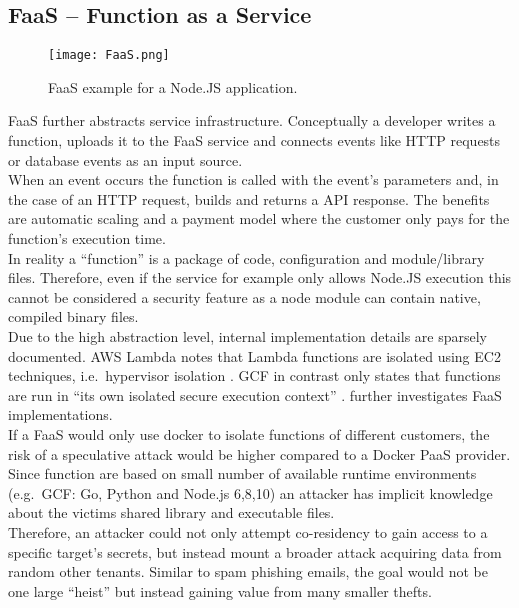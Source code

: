 \documentclass[conference,compsoc,final,a4paper]{IEEEtran}
\begin{document}
\subsection{\acs{FaaS} -- Function as a Service}
\begin{figure}[!ht]
\centering
\texttt{[image: FaaS.png]}
\caption{\ac{FaaS} example for a Node.JS application.}
\label{virtmem}
\end{figure}
\acs{FaaS} further abstracts service infrastructure. Conceptually a developer writes a function, uploads it to the \acs{FaaS} service and connects events like HTTP requests or database events as an input source. \\
When an event occurs the function is called with the event's parameters and, in the case of an HTTP request, builds and returns a API response. The benefits are automatic scaling and a payment model where the customer only pays for the function's execution time. \cite{lambdaFeatures} \\
In reality a \enquote{function} is a package of code, configuration and module/library files. Therefore, even if the service for example only allows Node.JS execution this cannot be considered a security feature as a node module can contain native, compiled binary files. \cite{lambdaFaq} \\
Due to the high abstraction level, internal implementation details are sparsely documented. \ac{AWS} Lambda notes that Lambda functions are isolated using EC2 techniques, i.e.\ hypervisor isolation \cite{lambdaFaq}. \ac{GCF} in contrast only states that functions are run in \enquote{its own isolated secure execution context} \cite{cloudFunc}. \textcite{wang2018peeking} further investigates \acs{FaaS} implementations. \\
If a \acs{FaaS} would only use docker to isolate functions of different customers, the risk of a speculative attack would be higher compared to a Docker \ac{PaaS} provider. Since function are based on small number of available runtime environments (e.g.\ \ac{GCF}: Go, Python and Node.js 6,8,10) \cite{cloudFunc} an attacker has implicit knowledge about the victims shared library and executable files. \\
Therefore, an attacker could not only attempt co-residency to gain access to a specific target's secrets, but instead mount a broader attack acquiring data from random other tenants. Similar to spam phishing emails, the goal would not be one large \enquote{heist} but instead gaining value from many smaller thefts.
\end{document}
